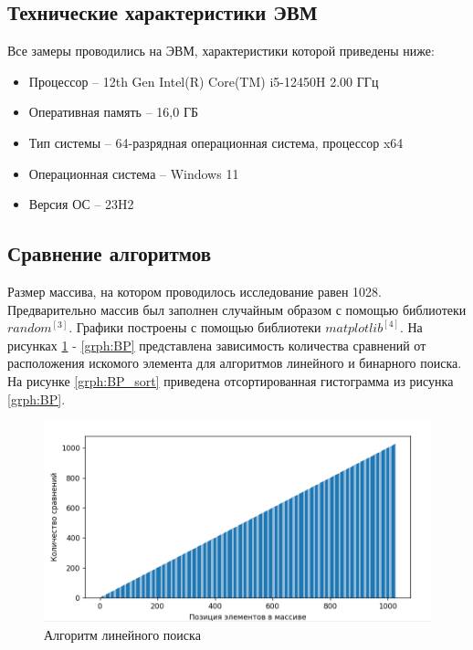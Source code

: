 \documentclass{article}
\begin{document}
\subsection{Технические характеристики ЭВМ}
Все замеры проводились на ЭВМ, характеристики которой приведены ниже:
\begin{itemize}
	\item Процессор -- 12th Gen Intel(R) Core(TM) i5-12450H   2.00 ГГц
	\item Оперативная память -- 16,0 ГБ
	\item Тип системы -- 64-разрядная операционная система, процессор x64
	\item Операционная система -- Windows 11
	\item Версия ОС -- 23H2
\end{itemize}

\subsection{Сравнение алгоритмов}
Размер массива, на котором проводилось исследование равен 1028. Предварительно массив был заполнен случайным образом
с помощью библиотеки $random^{[3]}$. Графики построены с помощью библиотеки $matplotlib^{[4]}$. На рисунках  \ref{grph:LP} 
- \ref{grph:BP} представлена зависимость количества сравнений от расположения искомого элемента для алгоритмов линейного 
и бинарного поиска. На рисунке \ref{grph:BP_sort} приведена отсортированная гистограмма из рисунка \ref{grph:BP}.

\begin{figure}[h]
	\centering
	\includegraphics[scale=0.9]{tools/Screenshot_1.png}
	\caption{Алгоритм линейного поиска}
	\label{grph:LP}
\end{figure}
\end{document}

